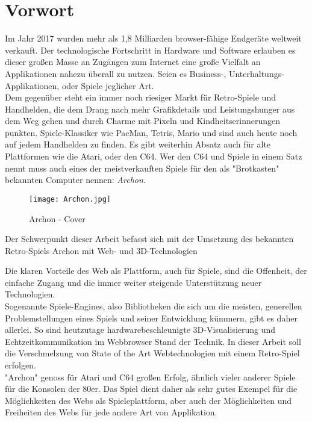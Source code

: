 \chapter*{Vorwort}
\label{cha:Vorwort}

Im Jahr 2017 wurden mehr als 1,8 Milliarden browser-fähige Endgeräte weltweit verkauft. Der technologische Fortschritt in Hardware und Software erlauben es dieser großen Masse an Zugängen zum Internet eine große Vielfalt an Applikationen nahezu überall zu nutzen. Seien es Business-, Unterhaltungs-Applikationen, oder Spiele jeglicher Art.\\
Dem gegenüber steht ein immer noch riesiger Markt für Retro-Spiele und Handhelden, die dem Drang nach mehr Grafikdetails und Leistungshunger aus dem Weg gehen und durch Charme mit Pixeln und Kindheitserinnerungen punkten. Spiele-Klassiker wie PacMan, Tetris, Mario und \uvm sind auch heute noch auf jedem Handhelden zu finden. Es gibt weiterhin Absatz auch für alte Plattformen wie die Atari, oder den C64. Wer den C64 und Spiele in einem Satz nennt muss auch eines der meistverkauften Spiele für den als "Brotkasten" bekannten Computer nennen: \emph{Archon}.\\
\begin{figure}[htp]
\centering
\captionsetup{justification=centering}
\texttt{[image: Archon.jpg]}
\caption[Archon - Cover]{Archon - Cover\footnotemark}
\label{fig:Archon_Cover}
\end{figure}



Der Schwerpunkt dieser Arbeit befasst sich mit der Umsetzung des bekannten Retro-Spiels Archon mit Web- und 3D-Technologien


Die klaren Vorteile des Web als Plattform, auch für Spiele, sind die Offenheit, der einfache Zugang und die immer weiter steigende Unterstützung neuer Technologien.\\
Sogenannte Spiele-Engines, also Bibliotheken die sich um die meisten, generellen Problemstellungen eines Spiels und seiner Entwicklung kümmern, gibt es daher allerlei.
So sind heutzutage hardwarebeschleunigte 3D-Visualisierung und Echtzeitkommunikation im Webbrowser Stand der Technik.
In dieser Arbeit soll die Verschmelzung von State of the Art Webtechnologien mit einem Retro-Spiel erfolgen.\\
"Archon" genoss für Atari und C64 großen Erfolg, ähnlich vieler anderer Spiele für die Konsolen der 80er.
Das Spiel dient daher als sehr gutes Exempel für die Möglichkeiten des Webs als Spieleplattform, aber auch der Möglichkeiten und Freiheiten des Webs für jede andere Art von Applikation.